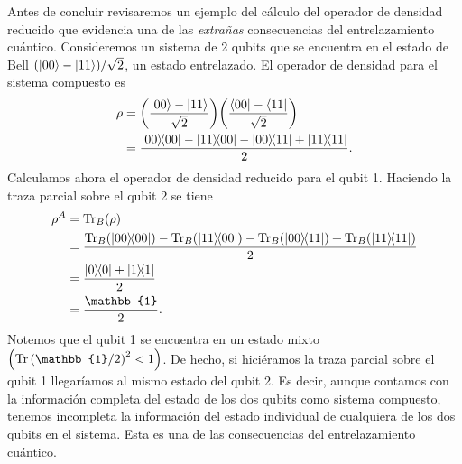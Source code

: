 
Antes de concluir revisaremos un ejemplo del cálculo del 
operador de densidad reducido que evidencia una de las
\textit{extrañas} consecuencias del
entrelazamiento cuántico.
Consideremos un sistema de 2 qubits que se encuentra en el estado de Bell
$\qty(\ket{00}-\ket{11})/\sqrt{2}$, un estado entrelazado. El operador
de densidad para el sistema compuesto es
\begin{align}
	\rho &= \qty(\frac{\ket{00}-\ket{11}}{\sqrt{2}})
	\qty(\frac{\bra{00}-\bra{11}}{\sqrt{2}}) \\
			 &= \frac{\dyad{00}{00}-\dyad{11}{00}-\dyad{00}{11}+\dyad{11}{11}}{2}.
\end{align}
Calculamos ahora el operador de densidad reducido para el qubit 1.  
Haciendo la traza parcial sobre el qubit 2 se tiene
\begin{align}
	\rho^A &= \Tr _B(\rho) \\
			 	 &= \frac{\Tr _B(\dyad{00}{00})-\Tr _B(\dyad{11}{00})
			 	 -\Tr _B(\dyad{00}{11})+\Tr _B(\dyad{11}{11})}{2} \\
			 	 &= \frac{\dyad{0}{0} + \dyad{1}{1}}{2} \\
			 	 &= \frac{\mathbb{1}}{2}.
\end{align}
Notemos que el qubit 1 se encuentra en un estado mixto
$\qty(\Tr \qty(\mathbb{1}/2)^2<1)$. De hecho, si hiciéramos la 
traza parcial sobre el qubit 1 llegaríamos al mismo estado del qubit 2.
Es decir, aunque contamos con la información completa del estado 
de los dos qubits como sistema compuesto, tenemos incompleta la 
información del estado individual de cualquiera de los dos qubits
en el sistema. Esta es una de las consecuencias del entrelazamiento
cuántico.

